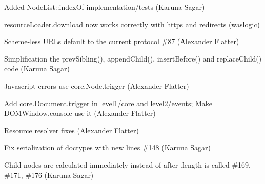 \begin{DoxyItemize}
\item Added Node\+List\+::index\+Of implementation/tests (Karuna Sagar)
\item resource\+Loader.\+download now works correctly with https and redirects (waslogic)
\item Scheme-\/less U\+R\+Ls default to the current protocol \#87 (Alexander Flatter)
\item Simplification the prev\+Sibling(), append\+Child(), insert\+Before() and replace\+Child() code (Karuna Sagar)
\item Javascript errors use core.\+Node.\+trigger (Alexander Flatter)
\item Add core.\+Document.\+trigger in level1/core and level2/events; Make D\+O\+M\+Window.\+console use it (Alexander Flatter)
\item Resource resolver fixes (Alexander Flatter)
\item Fix serialization of doctypes with new lines \#148 (Karuna Sagar)
\item Child nodes are calculated immediately instead of after .length is called \#169, \#171, \#176 (Karuna Sagar) 
\end{DoxyItemize}